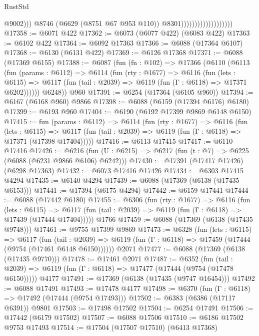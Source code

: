\begin{lexlean}{RustStd}
\begin{coremodule}
                                                @9002)))
                                          @8746
                                          (@6629 (@8751 @67 @953 @110))
                                          @8301)))))))))))))))))))
@17358 := @6071 @422
@17362 := @6073 (@6077 @422) (@6083 @422)
@17363 := @6102 @422
@17364 := @6092 @17363
@17366 := @6088 (@17364 @6107)
@17368 := @6130 (@6131 @422)
@17369 := @6126 @17368
@17371 := @6088 (@17369 @6155)
@17388 := @6087
    (fun (fn : @102) =>
    @17366
      (@6110
        (@6113
          (fun (params : @6112) =>
          @6114
            (fun (rty : @1677) =>
            @6116
              (fun (lets : @6115) =>
              @6117 (fun (tail : @2039) => @6119 (fun (Γ : @6118) => @17371 @6202))))))
        @6248))
    @960
@17391 := @6254 (@17364 (@6105 @960))
@17394 := @6167 (@6168 @960) @9866
@17398 := @6088 (@6159 (@17394 @6176) @6180)
@17399 := @6193 @960
@17404 := @6190 (@6192 @17399 @9869 @6148 @6150)
@17415 := fun (params : @6112) =>
  @6114
    (fun (rty : @1677) =>
    @6116
      (fun (lets : @6115) =>
      @6117 (fun (tail : @2039) => @6119 (fun (Γ : @6118) => @17371 (@17398 @17404)))))
@17416 := @6113 @17415
@17417 := @6110 @17416
@17426 := @6216 (fun (U : @6215) => @6217 (fun (t : @7) => @6225 (@6088 (@6231 @9866 @6106) @6242)))
@17430 := @17391 (@17417 @17426) (@6298 @17363)
@17432 := @6073 @17416 @17426
@17434 := @6303 @17415 @4294
@17435 := @6140 @4294
@17439 := @6088 (@17369 (@6138 (@17435 @6153)))
@17441 := @17394 (@6175 @4294)
@17442 := @6159 @17441
@17444 := @6088 (@17442 @6180)
@17455 := @6306
    (fun (rty : @1677) =>
    @6116
      (fun (lets : @6115) =>
      @6117 (fun (tail : @2039) => @6119 (fun (Γ : @6118) => @17439 (@17444 @17404)))))
    @1766
@17459 := @6088 (@17369 (@6138 (@17435 @9748)))
@17461 := @9755 @17399 @9869
@17473 := @6328
    (fun (lets : @6115) =>
    @6117
      (fun (tail : @2039) =>
      @6119 (fun (Γ : @6118) => @17459 (@17444 (@9754 (@17461 @6148 @6150))))))
    @2071
@17477 := @6088 (@17369 (@6138 (@17435 @9770)))
@17478 := @17461 @2071
@17487 := @6352
    (fun (tail : @2039) => @6119 (fun (Γ : @6118) => @17477 (@17444 (@9754 (@17478 @6150)))))
    @4177
@17491 := @17369 (@6138 (@17435 (@9747 @16454)))
@17492 := @6088 @17491
@17493 := @17478 @4177
@17498 := @6370 (fun (Γ : @6118) => @17492 (@17444 (@9754 @17493)))
@17502 := @6383 (@6386 (@17117 @6391)) @9801
@17503 := @17498 @17502
@17504 := @6254 @17491
@17506 := @17442 (@6179 @17502)
@17507 := @6088 @17506
@17510 := @6186 @17502 @9753 @17493
@17514 := @17504 (@17507 @17510) (@6413 @17368)

\end{coremodule}
\end{lexlean}
